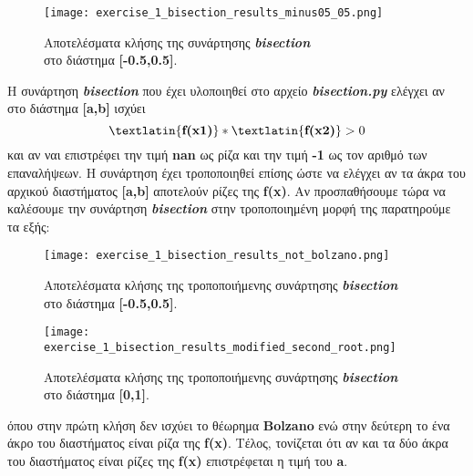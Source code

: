 \documentclass[First Project.tex]{subfiles}
\begin{document}
\begin{figure}[h!]
    \centering
    \captionsetup{justification=centering}
    \begin{center}
        \texttt{[image: exercise\_1\_bisection\_results\_minus05\_05.png]}    
        \caption{ Αποτελέσματα κλήσης της συνάρτησης \textit{\textlatin{\textbf{bisection}}} \\ στο διάστημα \textlatin{\textbf{[-0.5,0.5]}}. }
    \end{center}
\end{figure}

Η συνάρτηση \textit{\textlatin{\textbf{bisection}}} που έχει υλοποιηθεί στο αρχείο 
\textit{\textlatin{\textbf{bisection.py}}} ελέγχει αν στο διάστημα \textlatin{\textbf{[a,b]}} ισχύει 
\begin{equation*}
    \textlatin{\textbf{f(x1)}} * \textlatin{\textbf{f(x2)}} > 0
\end{equation*}
και αν ναι επιστρέφει την τιμή \textlatin{\textbf{nan}} ως ρίζα και την τιμή \textbf{-1} ως τον αριθμό των επαναλήψεων. Η συνάρτηση
έχει τροποποιηθεί επίσης ώστε να ελέγχει αν τα άκρα του αρχικού διαστήματος \textlatin{\textbf{[a,b]}} αποτελούν ρίζες της \textlatin{\textbf{f(x)}}.
Αν προσπαθήσουμε τώρα να καλέσουμε την συνάρτηση \textit{\textlatin{\textbf{bisection}}} στην τροποποιημένη μορφή της παρατηρούμε τα εξής:
\vspace{5px}
\begin{figure}[h!]
    \centering
    \captionsetup{justification=centering}
    \begin{center}
        \texttt{[image: exercise\_1\_bisection\_results\_not\_bolzano.png]}    
        \caption{ Αποτελέσματα κλήσης της τροποποιήμενης συνάρτησης \textit{\textlatin{\textbf{bisection}}} \\ στο διάστημα \textlatin{\textbf{[-0.5,0.5]}}. }
    \end{center}
\end{figure}
\vspace{5px}
\begin{figure}[h!]
    \centering
    \captionsetup{justification=centering}
    \begin{center}
        \texttt{[image: exercise\_1\_bisection\_results\_modified\_second\_root.png]}    
        \caption{ Αποτελέσματα κλήσης της τροποποιήμενης συνάρτησης \textit{\textlatin{\textbf{bisection}}} \\ στο διάστημα \textlatin{\textbf{[0,1]}}. }
    \end{center}
\end{figure}

όπου στην πρώτη κλήση δεν ισχύει το θέωρημα \textlatin{\textbf{Bolzano}} ενώ στην δεύτερη το ένα άκρο του διαστήματος είναι ρίζα της 
\textlatin{\textbf{f(x)}}. Τέλος, τονίζεται ότι αν και τα δύο άκρα του διαστήματος είναι ρίζες της \textlatin{\textbf{f(x)}} επιστρέφεται 
η τιμή του \textlatin{\textbf{a}}.
\newpage
\end{document}
